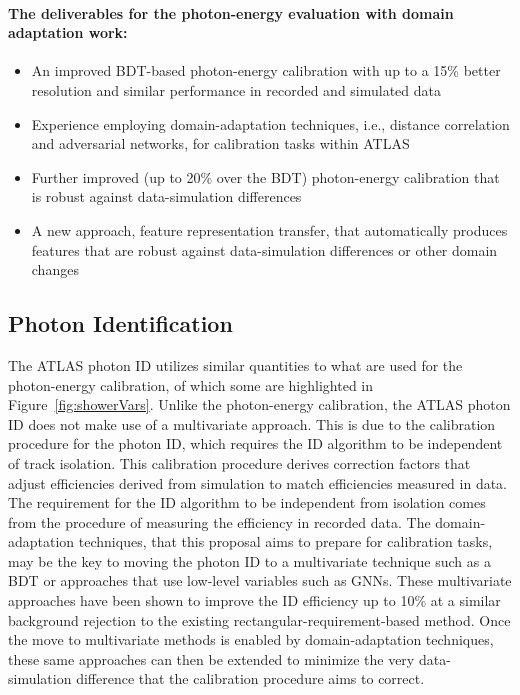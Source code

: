 \documentclass[letter, USenglish, 11pt, subfigure]{article}
\begin{document}
\paragraph{The deliverables for the photon-energy evaluation with domain adaptation work:}
\begin{itemize}
\item An improved BDT-based photon-energy calibration with up to a 15\% better resolution and similar performance in recorded and simulated data
\item Experience employing domain-adaptation techniques, i.e., distance correlation and adversarial networks, for calibration tasks within ATLAS
\item Further improved (up to 20\% over the BDT) photon-energy calibration that is robust against data-simulation differences
\item A new approach, feature representation transfer, that automatically produces features that are robust against data-simulation differences or other domain changes
\end{itemize}

\subsection{Photon Identification}

The ATLAS photon ID utilizes similar quantities to what are used for the photon-energy calibration, of which some are highlighted in Figure~\ref{fig:showerVars}. Unlike the photon-energy calibration, the ATLAS photon ID does not make use of a multivariate approach. This is due to the calibration procedure for the photon ID, which requires the ID algorithm to be independent of track isolation. This calibration procedure derives correction factors that adjust efficiencies derived from simulation to match efficiencies measured in data. The requirement for the ID algorithm to be independent from isolation comes from the procedure of measuring the efficiency in recorded data. The domain-adaptation techniques, that this proposal aims to prepare for calibration tasks, may be the key to moving the photon ID to a multivariate technique such as a BDT or approaches that use low-level variables such as GNNs. These multivariate approaches have been shown to improve the ID efficiency up to 10\% at a similar background rejection to the existing rectangular-requirement-based method. Once the move to multivariate methods is enabled by domain-adaptation techniques, these same approaches can then be extended to minimize the very data-simulation difference that the calibration procedure aims to correct.
\end{document}

